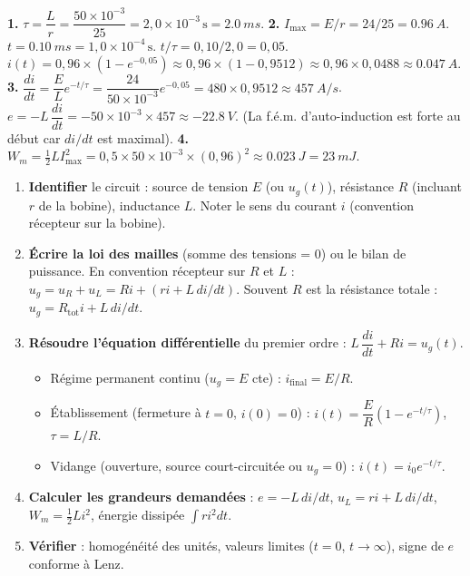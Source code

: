 \documentclass[11pt]{article}
\begin{document}
\begin{corrige}
\textbf{1.} $\tau = \dfrac{L}{r} = \dfrac{50 \times 10^{-3}}{25} = 2,0 \times 10^{-3}\,\text{s} = \SI{2,0}{ms}$.
\textbf{2.} $I_{\text{max}} = E/r = 24/25 = \SI{0,96}{A}$.
$t = \SI{0,10}{ms} = 1,0 \times 10^{-4}\,\text{s}$.
$t/\tau = 0,10 / 2,0 = 0,05$.
$i(t) = 0,96 \times (1 - e^{-0,05}) \approx 0,96 \times (1 - 0,9512) \approx 0,96 \times 0,0488 \approx \SI{0,047}{A}$.
\textbf{3.} $\dfrac{di}{dt} = \dfrac{E}{L} e^{-t/\tau} = \dfrac{24}{50 \times 10^{-3}} e^{-0,05} = 480 \times 0,9512 \approx \SI{457}{A/s}$.
$e = -L\,\dfrac{di}{dt} = -50 \times 10^{-3} \times 457 \approx \SI{-22,8}{V}$.
(La f.é.m. d'auto-induction est forte au début car $di/dt$ est maximal).
\textbf{4.} $W_m = \frac{1}{2} L I_{\text{max}}^2 = 0,5 \times 50 \times 10^{-3} \times (0,96)^2 \approx \SI{0,023}{J} = \SI{23}{mJ}$.
\end{corrige}

\begin{methode}
\begin{enumerate}
\item \textbf{Identifier} le circuit : source de tension $E$ (ou $u_g(t)$), résistance $R$ (incluant $r$ de la bobine), inductance $L$. Noter le sens du courant $i$ (convention récepteur sur la bobine).
\item \textbf{Écrire la loi des mailles} (somme des tensions = 0) ou le bilan de puissance. En convention récepteur sur $R$ et $L$ : $u_g = u_R + u_L = R i + (r i + L\,di/dt)$. Souvent $R$ est la résistance totale : $u_g = R_{\text{tot}} i + L\,di/dt$.
\item \textbf{Résoudre l'équation différentielle} du premier ordre : $L\,\dfrac{di}{dt} + R i = u_g(t)$.
\begin{itemize}
\item Régime permanent continu ($u_g = E$ cte) : $i_{\text{final}} = E/R$.
\item Établissement (fermeture à $t=0$, $i(0)=0$) : $i(t) = \dfrac{E}{R}(1 - e^{-t/\tau})$, $\tau = L/R$.
\item Vidange (ouverture, source court-circuitée ou $u_g=0$) : $i(t) = i_0 e^{-t/\tau}$.
\end{itemize}
\item \textbf{Calculer les grandeurs demandées} : $e = -L\,di/dt$, $u_L = r i + L\,di/dt$, $W_m = \frac{1}{2}L i^2$, énergie dissipée $\int r i^2 dt$.
\item \textbf{Vérifier} : homogénéité des unités, valeurs limites ($t=0$, $t\to\infty$), signe de $e$ conforme à Lenz.
\end{enumerate}
\end{methode}
\end{document}

